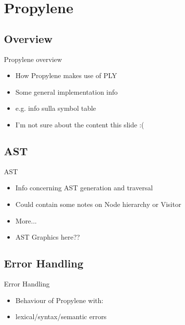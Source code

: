 \section{Propylene}

\subsection{Overview}
\begin{frame}{Propylene overview}
  \begin{itemize}
    \item How Propylene makes use of PLY 
\N
    \item Some general implementation info
\N
    \item e.g. info sulla symbol table
\N
    \item I'm not sure about the content this slide :(
 
  \end{itemize}
%
\N\N
\end{frame}


\subsection{AST}
\begin{frame}{AST}
  \begin{itemize}
    \item Info concerning AST generation and traversal
\N
    \item Could contain some notes on Node hierarchy or Visitor
\N
    \item More...
\N
    \item AST Graphics here??
 
  \end{itemize}
%
\N\N
\end{frame}


\subsection{Error Handling}
\begin{frame}{Error Handling}
  \begin{itemize}
    \item Behaviour of Propylene with:
\N
    \item lexical/syntax/semantic errors
% 
  \end{itemize}
%
\N\N
\end{frame}


